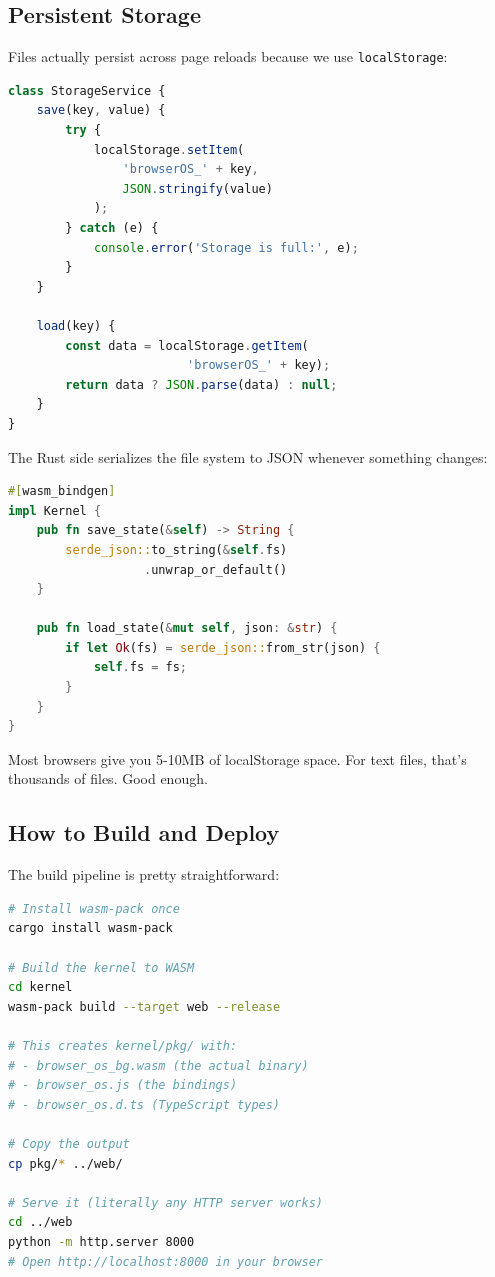 \documentclass[conference]{IEEEtran}
\begin{document}
\subsection{Persistent Storage}

Files actually persist across page reloads because we use \texttt{localStorage}:

\begin{lstlisting}[language=JavaScript, caption=Storage Service]
class StorageService {
    save(key, value) {
        try {
            localStorage.setItem(
                'browserOS_' + key, 
                JSON.stringify(value)
            );
        } catch (e) {
            console.error('Storage is full:', e);
        }
    }
    
    load(key) {
        const data = localStorage.getItem(
                         'browserOS_' + key);
        return data ? JSON.parse(data) : null;
    }
}
\end{lstlisting}

The Rust side serializes the file system to JSON whenever something changes:

\begin{lstlisting}[language=Rust, caption=FS Serialization]
#[wasm_bindgen]
impl Kernel {
    pub fn save_state(&self) -> String {
        serde_json::to_string(&self.fs)
                   .unwrap_or_default()
    }
    
    pub fn load_state(&mut self, json: &str) {
        if let Ok(fs) = serde_json::from_str(json) {
            self.fs = fs;
        }
    }
}
\end{lstlisting}

Most browsers give you 5-10MB of localStorage space. For text files, that's thousands of files. Good enough.

\subsection{How to Build and Deploy}

The build pipeline is pretty straightforward:

\begin{lstlisting}[language=bash, caption=Build Commands]
# Install wasm-pack once
cargo install wasm-pack

# Build the kernel to WASM
cd kernel
wasm-pack build --target web --release

# This creates kernel/pkg/ with:
# - browser_os_bg.wasm (the actual binary)
# - browser_os.js (the bindings)
# - browser_os.d.ts (TypeScript types)

# Copy the output
cp pkg/* ../web/

# Serve it (literally any HTTP server works)
cd ../web
python -m http.server 8000
# Open http://localhost:8000 in your browser
\end{lstlisting}
\end{document}

